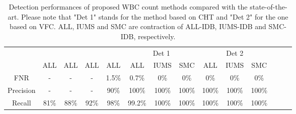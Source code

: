 \documentclass[final,a4paper,12pt,english]{UnicaPhdThesis3}
\begin{document}
{\begin{table}[t]
	\centering\tabcolsep=0.2mm
	\begin{tabular}{c cccc ccc ccc ccc}
		\hline
		& \small \cite{Mahmood}	&	\small \cite{Alilou}  	&	\small \cite{Put14b}	&	\small \cite{Alomari}	&	\multicolumn{3}{c}{Det 1} & \multicolumn{3}{c}{Det 2}\\
		&  \small ALL   &  \small ALL  & 	\small ALL  & 	\small ALL  &  \small ALL  &	\small IUMS & \small SMC &  \small ALL  &	\small IUMS & \small SMC \\
		\hline
		FNR			& 	- 	& 	- 	&	-	&	1.5\% 	&	0.7\% 	& 	0\%  & 0\% & 0\% & 0\% & 0\% \\
		Precision 	&	-	& 	- &	- &	90\% &	100\%  & 100\% 	& 	100\% & 100\% & 100\% & 100\% \\
		Recall		& 	81\%  &  88\% & 92\% & 	98\% &	99.2\% 	& 	100\%  & 100\% & 100\% & 100\% & 100\% \\
		\hline
	\end{tabular} 
	\label{resulttab}
	\caption{Detection performances of proposed WBC count methods compared with the state-of-the-art. Please note that "Det 1" stands for the method based on CHT and "Det 2" for the one based on VFC. ALL, IUMS and SMC are contraction of ALL-IDB, IUMS-IDB and SMC-IDB, respectively.}
\end{table}

}
\end{document}
